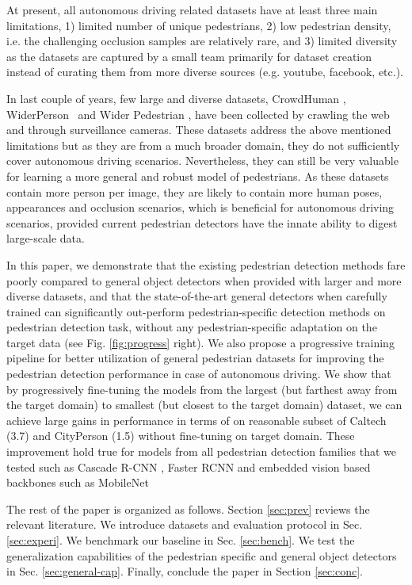 \documentclass[final]{cvpr}
\newcommand{\LMR}[1]{{}}
\newcommand{\mobnet}[1]{{MobileNet~\cite{howard2017mobilenets}}}
\newcommand{\widerpersona}[1]{{Wider Pedestrian}}
\begin{document}
At present, all autonomous driving related datasets have at least three main limitations, 1) limited number of unique pedestrians, 2) low pedestrian density, i.e. the challenging occlusion samples are relatively rare, and 3) limited diversity as the datasets are captured by a small team primarily for dataset creation instead of curating them from more diverse sources (e.g. youtube, facebook, etc.).



In last couple of years, few large and diverse datasets, CrowdHuman \cite{shao2018crowdhuman}, WiderPerson~\cite{zhang2019widerpersondataset} and \widerpersona{} \cite{zhang2019widerperson}, have been collected by crawling the web and through surveillance cameras.
These datasets address the above mentioned limitations but as they are from a much broader domain, they do not sufficiently cover autonomous driving scenarios.
Nevertheless, they can still be very valuable for learning a more general and robust model of pedestrians. 
As these datasets contain more person per image, they are likely to contain more human poses, appearances and occlusion scenarios, which is beneficial for autonomous driving scenarios, provided current pedestrian detectors have the innate ability to digest large-scale data.

In this paper, we demonstrate that the existing pedestrian detection methods fare poorly compared to general object detectors when provided with larger and more diverse datasets, and that the state-of-the-art general detectors when carefully trained can significantly out-perform pedestrian-specific detection methods on pedestrian detection task, without any pedestrian-specific adaptation on the target data (see Fig. \ref{fig:progress} right).
We also propose a progressive training pipeline for better utilization of general pedestrian datasets for improving the pedestrian detection performance in case of autonomous driving.
We show that by progressively fine-tuning the models from the largest (but farthest away from the target domain) to smallest (but closest to the target domain) dataset, we can achieve large gains in performance in terms of \LMR{} on reasonable subset of Caltech (3.7) and CityPerson (1.5) without fine-tuning on target domain.
These improvement hold true for models from all pedestrian detection families that we tested such as Cascade R-CNN \cite{cai2019cascade}, Faster RCNN \cite{ren2015faster} and embedded vision based backbones such as \mobnet.


The rest of the paper is organized as follows. Section \ref{sec:prev} reviews the relevant literature. 
We introduce datasets and evaluation protocol in Sec. \ref{sec:experi}. We benchmark our baseline in Sec. \ref{sec:bench}. 
We test the generalization capabilities of the pedestrian specific and general object detectors in Sec. \ref{sec:general-cap}. 
Finally, conclude the paper in Section \ref{sec:conc}.
\end{document}
